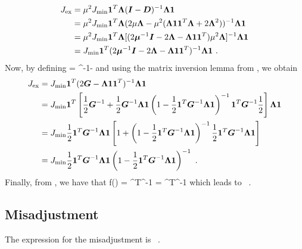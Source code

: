 \begin{align}
  J_\textup{ex} &= \mu^2J_\textup{min}\vect{1}^T\vect{\Lambda}(\vect{I}-\vect{D})^{-1}\vect{\Lambda}\vect{1}\\
  &= \mu^2J_\textup{min}\vect{1}^T\vect{\Lambda}(2\mu\vect{\Lambda}-\mu^2(\vect{\Lambda}\vect{1}\vect{1}^T\vect{\Lambda}+2\vect{\Lambda}^2))^{-1}\vect{\Lambda}\vect{1}\\
  &= \mu^2J_\textup{min}\vect{1}^T\vect{\Lambda}[(2\vect{\mu}^{-1}\vect{I}-2\vect{\Lambda}-\vect{\Lambda}\vect{1}\vect{1}^T)\mu^2\vect{\Lambda}]^{-1}\vect{\Lambda}\vect{1}\\
  &= J_\textup{min}\vect{1}^T(2\vect{\mu}^{-1}\vect{I}-2\vect{\Lambda}-\vect{\Lambda}\vect{1}\vect{1}^T)^{-1}\vect{\Lambda}\vect{1}\ .
\end{align}
Now, by defining
\bmath
   = \vect{\mu}^{-1}-\vect{\Lambda}
\emath
and using the matrix inversion lemma from , we obtain
\begin{align}
  J_\textup{ex} &= J_\textup{min}\vect{1}^T(2\vect{G}-\vect{\Lambda}\vect{1}\vect{1}^T)^{-1}\vect{\Lambda}\vect{1}\\
  &= J_\textup{min}\vect{1}^T\left[\frac{1}{2}\vect{G}^{-1}+\frac{1}{2}\vect{G}^{-1}\vect{\Lambda}\vect{1}\left(1-\frac{1}{2}\vect{1}^T\vect{G}^{-1}\vect{\Lambda}\vect{1}\right)^{-1}\vect{1}^T\vect{G}^{-1}\frac{1}{2}\right]\vect{\Lambda}\vect{1}\\
  &= J_\textup{min}\frac{1}{2}\vect{1}^T\vect{G}^{-1}\vect{\Lambda}\vect{1}\left[1+\left(1-\frac{1}{2}\vect{1}^T\vect{G}^{-1}\vect{\Lambda}\vect{1}\right)^{-1}\frac{1}{2}\vect{1}^T\vect{G}^{-1}\vect{\Lambda}\vect{1}\right]\\
  &= J_\textup{min}\frac{1}{2}\vect{1}^T\vect{G}^{-1}\vect{\Lambda}\vect{1}\left(1-\frac{1}{2}\vect{1}^T\vect{G}^{-1}\vect{\Lambda}\vect{1}\right)^{-1}\ .
\end{align}
Finally, from , we have that
\bmath
  f(\mu) = ^T\vect{\Lambda}^{-1} = ^T^{-1}\vect{\Lambda}
\emath
which leads to
\bmath
  \ .
\emath

\subsection{Misadjustment}
The expression for the misadjustment is
\bmath
  \ .
\emath
